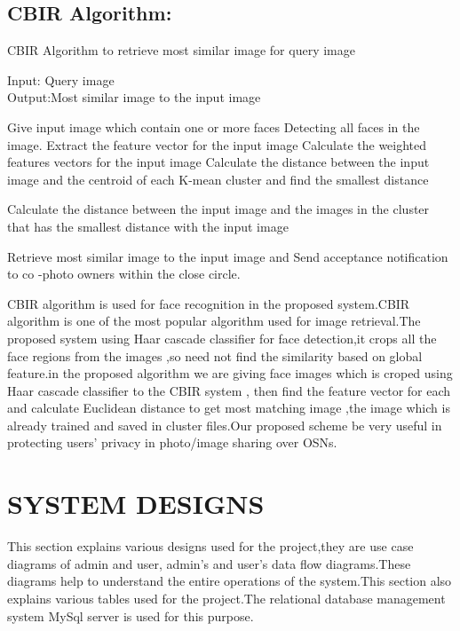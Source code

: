 \subsection[CBIR Algorithm:]{CBIR Algorithm:}
\begin{algorithm}

\caption{CBIR Algorithm to  retrieve most similar image for query image}
   Input: Query image\\
   Output:Most similar image to  the input image\\
\begin{algorithmic}[1]
\State Give input image which contain one or more faces
\State Detecting all faces in the image.
\State Extract the feature vector for the input image 
\State Calculate the weighted features vectors for the input image
\State Calculate the distance between the input image and the centroid            of each K-mean  cluster  and find  the smallest distance

\State Calculate the distance between the input image and the images
            in the cluster that has the smallest distance with
             the    input image

\State Retrieve   most similar image to the input image  and Send acceptance 
            notification to co -photo owners within the close circle.


\end{algorithmic}
\end{algorithm}

  \vspace*{1pc}
CBIR algorithm is used for face recognition in the proposed system.CBIR algorithm is one of the most popular algorithm used for image retrieval.The proposed system  using Haar cascade classifier for face detection,it crops all the face regions from the images ,so need not find the similarity based on global feature.in the proposed algorithm we are  giving face images  which is croped using  Haar cascade classifier to the CBIR system , then find  the feature vector for each and calculate  Euclidean distance to get most matching image ,the image which is already trained and saved in cluster files.Our proposed scheme be  very useful in protecting users’ privacy in photo/image sharing over OSNs.
\clearpage

\section[System Designs]{\fontsize{14}{12}\selectfont SYSTEM DESIGNS}
This section explains various designs used for the project,they are use case diagrams of admin and user, admin's and user's data flow diagrams.These diagrams help to understand the entire operations of the system.This section also explains various tables used for the project.The relational database management system MySql server is used for this purpose.

